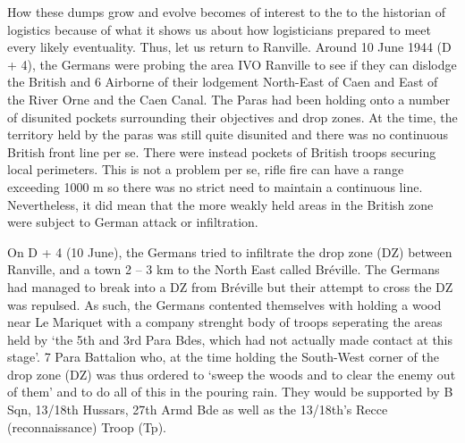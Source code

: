 \documentclass[noraggedright]{turabian-researchpaper}
\begin{document}
How these dumps grow and evolve becomes of interest to the to the historian 
of logistics because of what it shows us about how logisticians prepared to 
meet every likely eventuality. Thus, let us return to Ranville.  Around 10 
June 1944 (D + 4), the Germans were probing the area IVO Ranville to see if 
they can dislodge the British and 6 Airborne of their lodgement North-East of 
Caen and East of the River Orne and the Caen Canal. The Paras had been holding
onto a number of disunited pockets surrounding their objectives and drop zones.
At the time, the territory held by the paras was still quite disunited and 
there was no continuous British front line per se. There were instead pockets 
of British troops securing local perimeters.  This is not a problem per se, 
rifle fire can have a range exceeding 1000 m so there was no strict need to 
maintain a continuous line. %
Nevertheless, it did mean that the more weakly held areas in the British zone 
were subject to German attack or infiltration.  

On D + 4 (10 June), the Germans tried to infiltrate the drop zone (DZ) between 
Ranville, and a town 2 -- 3 km to the North East called Bréville.  The 
Germans had managed to break into a DZ from Bréville but their attempt to 
cross the DZ was repulsed.  As such, the Germans contented 
themselves with holding a wood near Le Mariquet with a company strenght body of 
troops seperating the areas held by `the 5th and 3rd Para Bdes, which had not 
actually made contact at this stage'.\autocite[June, Appendix 2, p 1] {7parawd}
7 Para Battalion who, at the time holding the South-West corner of the drop 
zone (DZ) was thus ordered to `sweep the woods and to clear the enemy out of 
them' and to do all of this in the pouring rain.\autocite[June 1944, Appendix 
2, p 1]{7parawd} They would be supported by B Sqn, 13/18th Hussars, 27th Armd 
Bde as well as the 13/18th's Recce (reconnaissance) Troop (Tp).\autocites[
	June 1944, Appendix 2, p 1] {7parawd}[10 June 1944]{1318wd}
\end{document}
